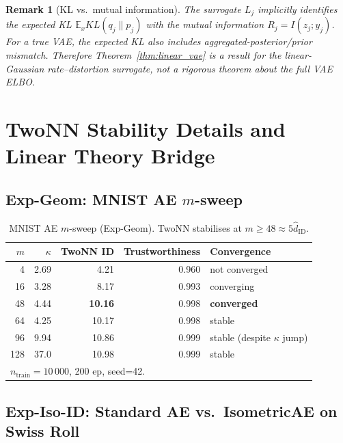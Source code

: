 \documentclass[11pt,a4paper]{article}
\newtheorem{remark}{Remark}
\newcommand{\kap}{\kappa}
\newcommand{\hatdID}{\hat{d}_{\mathrm{ID}}}
\begin{document}
\begin{remark}[KL vs.\ mutual information]
The surrogate $L_j$ implicitly identifies the expected KL $\mathbb{E}_xKL(q_j\|p_j)$
with the mutual information $R_j=I(z_j;y_j)$.
For a true VAE, the expected KL also includes aggregated-posterior/prior mismatch.
Therefore Theorem~\ref{thm:linear_vae} is a result for the \emph{linear-Gaussian
rate--distortion surrogate}, not a rigorous theorem about the full VAE ELBO.
\end{remark}

\section{TwoNN Stability Details and Linear Theory Bridge}
\label{app:twonn_detail}

\subsection{Exp-Geom: MNIST AE $m$-sweep}

\begin{table}[H]
\centering
\caption{MNIST AE $m$-sweep (Exp-Geom). TwoNN stabilises at $m\geq48\approx5\hatdID$.}
\label{tab:eq_mnist}
\small
\begin{tabular}{rrrrl}
\toprule
$m$ & $\kap$ & TwoNN ID & Trustworthiness & Convergence \\
\midrule
 4  & 2.69 & 4.21 & 0.960 & not converged \\
16  & 3.28 & 8.17 & 0.993 & converging \\
48  & 4.44 & \textbf{10.16} & 0.998 & \textbf{converged} \\
64  & 4.25 & 10.17 & 0.998 & stable \\
96  & 9.94 & 10.86 & 0.999 & stable (despite $\kap$ jump) \\
128 & 37.0 & 10.98 & 0.999 & stable \\
\midrule
\multicolumn{5}{l}{\small $n_{\mathrm{train}}=10\,000$, 200 ep, seed=42.} \\
\bottomrule
\end{tabular}
\end{table}

\subsection{Exp-Iso-ID: Standard AE vs.\ IsometricAE on Swiss Roll}
\end{document}
